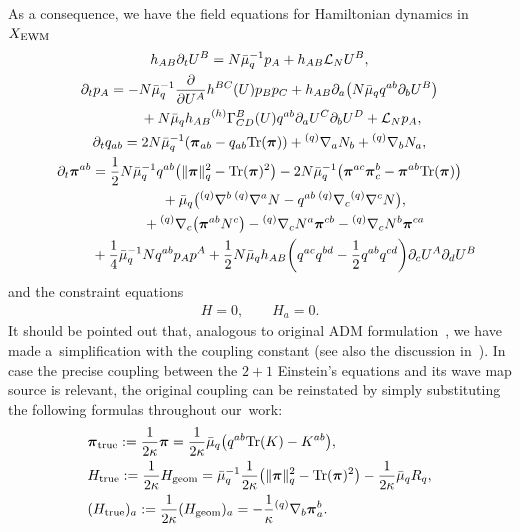\documentclass[11pt]{article}
\numberwithin{equation}{section}
\def\ptl{\partial}%
\def\mbo#1{\boldsymbol{#1}}%
\def\grad{{\nabla}}%
\newcommand{\leftexp}[2]{{\vphantom{#2}}^{#1}{#2}}
\def\halb{\frac{1}{2}}%
\numberwithin{equation}{section}
\begin{document}
As a consequence, we have the field equations for Hamiltonian dynamics in $X_{{\rm EWM}}$
\begin{subequations}
\begin{gather}
h_{AB} \ptl_t U^B = N \bar{\mu}^{-1}_q p_A + h_{AB} \mathcal{L}_N U^B, \\
\ptl_t p_A= - N \bar{\mu}^{-1}_q\frac{\ptl}{\ptl U^A}h^{BC} (U) p_B p_C + h_{AB} \ptl_a\bigl(N \bar{\mu}_q q^{ab} \ptl_b U^B\bigr) \notag\\
 \hphantom{\ptl_t p_A=}{}
 + N \bar{\mu}_q h_{AB} \leftexp{(h)}{\Gamma}^B_{CD}(U)q^{ab}\ptl_a U^C \ptl_b U^D + \mathcal{L}_N p_A,\\
\ptl_t q_{ab} = 2 N \bar{\mu}^{-1}_q (\mbo{\pi}_{ab} - q_{ab} {\rm Tr} (\mbo{\pi})) + \leftexp{(q)}{\grad}_a N_b + \leftexp{(q)}{\grad}_b N_a, \label{qdot}\\
\ptl_t \mbo{\pi}^{ab}= \halb N \bar{\mu}^{-1}_q q^{ab} \bigl(\Vert \mbo{\pi} \Vert^2_q - {\rm Tr}(\mbo{\pi})^2\bigr)- 2N \bar{\mu}^{-1}_q \bigl( \mbo{\pi}^{ac} \mbo{\pi}^{b}_c - \mbo{\pi}^{ab} {\rm Tr}(\mbo{\pi}) \bigr) \notag\\
\hphantom{\ptl_t \mbo{\pi}^{ab}=}{}
 +\bar{\mu}_q \bigl(\leftexp{(q)}{\grad}^b \,\leftexp{(q)}{\grad}^a N -q^{ab}\, \leftexp{(q)}{\grad}_c \leftexp{(q)}{\grad}^c N\bigr), \notag\\
\hphantom{\ptl_t \mbo{\pi}^{ab}=}{}
 + \leftexp{(q)}{\grad}_c\bigl(\mbo{\pi}^{ab} N^c\bigr) - \leftexp{(q)}{\grad}_c N^a \mbo{\pi}^{cb} - \leftexp{(q)}{\grad}_c N^b \mbo{\pi}^{ca}\notag\\
\hphantom{\ptl_t \mbo{\pi}^{ab}=}{}
 + \frac{1}{4}\bar{\mu}_q^{-1}N q^{ab} p_A p^A + \halb N \bar{\mu}_q h_{AB} \biggl(q^{ac}q^{bd} - \halb q^{ab} q^{cd}\biggr)\ptl_c U^A \ptl_d U^B
\end{gather}
\end{subequations}
and the constraint equations
\begin{align}\label{constraints}
H=0, \qquad H_a =0.
\end{align}
It should be pointed out that, analogous to original ADM formulation~\cite{ADM_62}, we have made a~simplification with the coupling constant (see also the discussion in~\cite[pp.~520--521]{MTW}). In case the precise coupling between the $2 + 1$ Einstein's equations and its wave map source is relevant, the original coupling can be reinstated by simply substituting the following formulas throughout our~work:
\begin{align*}
&\mbo{\pi}_{{\rm true}} := \frac{1}{2\kappa} \mbo{\pi}= \frac{1}{2\kappa} \bar{\mu}_q \bigl(q^{ab} {\rm Tr}(K) - K^{ab} \bigr), \\
&H_{{\rm true}} := \frac{1}{2\kappa} H_{{\rm geom}} = \bar{\mu}^{-1}_q \frac{1}{2\kappa} \bigl(\Vert \mbo{\pi} \Vert_q^2 - {\rm Tr}(\mbo{\pi})^2 \bigr) - \frac{1}{2\kappa} \bar{\mu}_q R_q, \\
&(H_{{\rm true}})_a := \frac{1}{2 \kappa} (H_{{\rm geom}})_a = -\frac{1}{\kappa} \leftexp{(q)}{\grad}_b \mbo{\pi}^{b}_a.
\end{align*}
\end{document}
